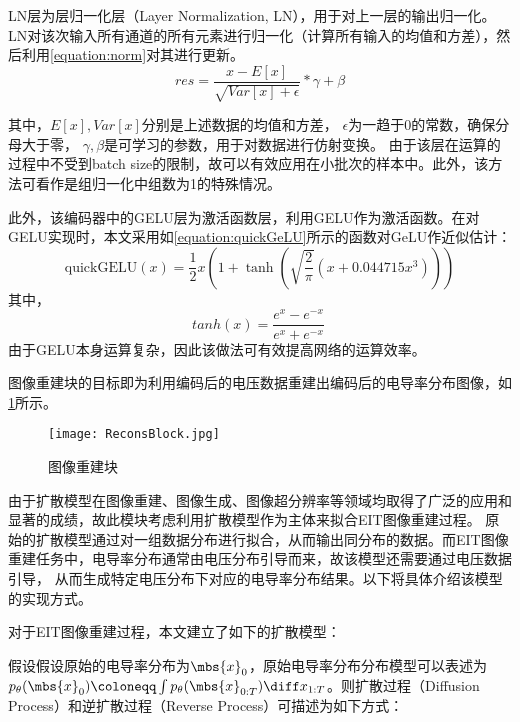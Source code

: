 LN层为层归一化层（Layer Normalization, LN），用于对上一层的输出归一化。
LN对该次输入所有通道的所有元素进行归一化（计算所有输入的均值和方差），然后利用\cref{equation:norm}对其进行更新。
\begin{equation}
  \label{equation:norm}
  res = \frac{x - E\left[ x\right]}{\sqrt{Var\left[ x\right] + \epsilon}} * \gamma + \beta
\end{equation}

其中，$E\left[ x\right], Var\left[ x\right]$分别是上述数据的均值和方差， $\epsilon$为一趋于0的常数，确保分母大于零，
$\gamma, \beta$是可学习的参数，用于对数据进行仿射变换。
由于该层在运算的过程中不受到batch size的限制，故可以有效应用在小批次的样本中。此外，该方法可看作是组归一化中组数为1的特殊情况。


此外，该编码器中的GELU层为激活函数层，利用GELU作为激活函数。在对GELU实现时，本文采用如\cref{equation:quickGeLU}所示的函数对GeLU作近似估计：
  \begin{equation}
    \label{equation:quickGeLU}
    \text{quickGELU}(x) = \frac{1}{2}x\left(1 + \tanh\left(\sqrt{\frac{2}{\pi}}\left(x + 0.044715x^3\right)\right)\right)
  \end{equation}
  其中，
  \begin{equation}
    tanh(x) = \frac{{e^{x} - e^{-x}}}{{e^{x} + e^{-x}}}
\
  \end{equation}
由于GELU本身运算复杂，因此该做法可有效提高网络的运算效率。



图像重建块的目标即为利用编码后的电压数据重建出编码后的电导率分布图像，如\cref{figure:ReconsBlock}所示。
\begin{figure}[h]
    \centering
    \texttt{[image: ReconsBlock.jpg]}
    \caption{图像重建块}
    \label{figure:ReconsBlock}
\end{figure}

由于扩散模型在图像重建、图像生成、图像超分辨率等领域均取得了广泛的应用和显著的成绩，故此模块考虑利用扩散模型作为主体来拟合EIT图像重建过程。
原始的扩散模型通过对一组数据分布进行拟合，从而输出同分布的数据。而EIT图像重建任务中，电导率分布通常由电压分布引导而来，故该模型还需要通过电压数据引导，
从而生成特定电压分布下对应的电导率分布结果。以下将具体介绍该模型的实现方式。

对于EIT图像重建过程，本文建立了如下的扩散模型：

假设假设原始的电导率分布为$\mbs{x}_0$，原始电导率分布分布模型可以表述为
$p_\theta(\mbs{x}_0) \coloneqq \int p_\theta(\mbs{x}_{0:T})\diff x_{1:T}$。则扩散过程（Diffusion Process）和逆扩散过程（Reverse Process）可描述为如下方式：

